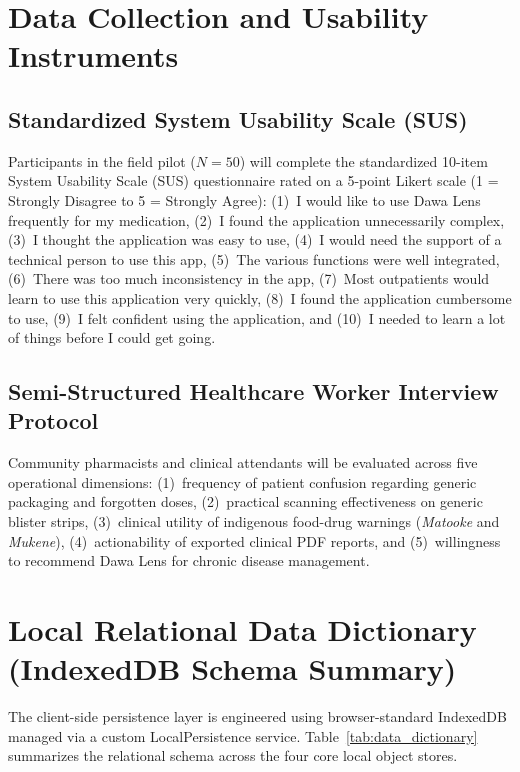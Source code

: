 \section{Data Collection and Usability Instruments}
\label{app:instruments}

\subsection*{Standardized System Usability Scale (SUS)}
Participants in the field pilot ($N=50$) will complete the standardized 10-item System Usability Scale (SUS) questionnaire \cite{brooke1996sus} rated on a 5-point Likert scale (1 = Strongly Disagree to 5 = Strongly Agree): (1)~I would like to use Dawa Lens frequently for my medication, (2)~I found the application unnecessarily complex, (3)~I thought the application was easy to use, (4)~I would need the support of a technical person to use this app, (5)~The various functions were well integrated, (6)~There was too much inconsistency in the app, (7)~Most outpatients would learn to use this application very quickly, (8)~I found the application cumbersome to use, (9)~I felt confident using the application, and (10)~I needed to learn a lot of things before I could get going.

\subsection*{Semi-Structured Healthcare Worker Interview Protocol}
Community pharmacists and clinical attendants will be evaluated across five operational dimensions: (1)~frequency of patient confusion regarding generic packaging and forgotten doses, (2)~practical scanning effectiveness on generic blister strips, (3)~clinical utility of indigenous food-drug warnings (\textit{Matooke} and \textit{Mukene}), (4)~actionability of exported clinical PDF reports, and (5)~willingness to recommend Dawa Lens for chronic disease management.

\section{Local Relational Data Dictionary (IndexedDB Schema Summary)}

The client-side persistence layer is engineered using browser-standard IndexedDB managed via a custom LocalPersistence service. Table~\ref{tab:data_dictionary} summarizes the relational schema across the four core local object stores.

